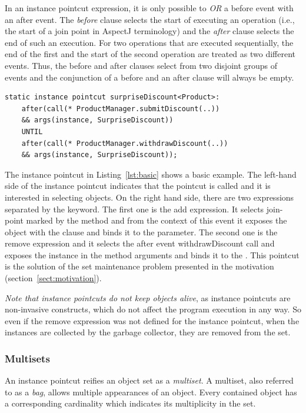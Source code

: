 In an instance pointcut expression, it is only possible to \emph{OR} a before event with an after event. 
The \emph{before} clause selects the start of executing an operation (i.e., the start of a join point in AspectJ terminology) and the \emph{after} clause selects the end of such an execution. 
For two operations that are executed sequentially, the end of the first and the start of the second operation are treated as two different events. Thus, the before and after clauses select from two disjoint groups of events and the conjunction of a before and an after clause will always be empty.

\begin{lstlisting}[float=h!, caption={A basic instance pointcut declaration with add and remove expressions}, label={lst:basic}]
static instance pointcut surpriseDiscount<Product>: 
	after(call(* ProductManager.submitDiscount(..)) 
	&& args(instance, SurpriseDiscount)) 
	UNTIL 
	after(call(* ProductManager.withdrawDiscount(..)) 
	&& args(instance, SurpriseDiscount));
\end{lstlisting}

The instance pointcut in Listing~\ref{lst:basic} shows a basic example. The left-hand side of the instance pointcut indicates that the pointcut is called  and it is interested in selecting  objects. 
On the right hand side, there are two expressions separated by the  keyword. The first one is the add expression. It selects join-point marked by the method  and from the context of this event it exposes the  object with the  clause and binds it to the  parameter. 
The second one is the remove expression and it selects the after event \textsf{withdrawDiscount} call and exposes the  instance in the method arguments and binds it to the .
This pointcut is the solution of the set maintenance problem presented in the motivation (section~\ref{sect:motivation}).
 

\emph{Note that instance pointcuts do not keep objects alive}, as instance pointcuts are non-invasive constructs, which do not affect the program execution in any way. So even if the remove expression was not defined for the  instance pointcut, when the  instances are collected by the garbage collector, they are removed from the set. 

\subsubsection{Multisets}
An instance pointcut reifies an object set as a \emph{multiset}. A multiset, also referred to as a \emph{bag}, allows multiple appearances of an object. Every contained object has a corresponding cardinality which indicates its multiplicity in the set.  
%

